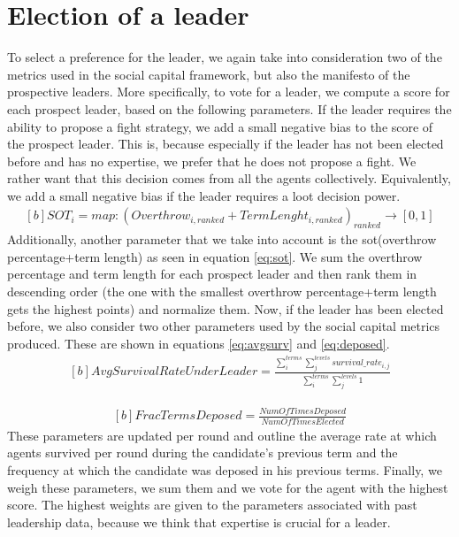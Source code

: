 \section{Election of a leader}To select a preference for the leader, we again take into consideration two of the metrics used in the social capital framework, but also the manifesto of the prospective leaders. More specifically, to vote for a leader, we compute a score for each prospect leader, based on the following parameters. If the leader requires the ability to propose a fight strategy, we add a small negative bias to the score of the prospect leader. This is, because especially if the leader has not been elected before and has no expertise, we prefer that he does not propose a fight. We rather want that this decision comes from all the agents collectively. Equivalently, we add a small negative bias if the leader requires a loot decision power. 
\begin{equation}
\label{eq:sot}
\begin{aligned}[b]
SOT_i = map : (Overthrow_{i,ranked} + TermLenght_{i, ranked})_{ranked} \rightarrow [0,1]
\end{aligned}
\end{equation}
Additionally, another parameter that we take into account is the sot(overthrow percentage+term length) as seen in equation \ref{eq:sot}. We sum the overthrow percentage and term length for each prospect leader and then rank them in descending order (the one with the smallest overthrow percentage+term length gets the highest points) and normalize them. Now, if the leader has been elected before, we also consider two other parameters used by the social capital metrics produced. These are shown in equations \ref{eq:avgsurv} and \ref{eq:deposed}.
\begin{equation}
\label{eq:avgsurv}
\begin{aligned}[b]
AvgSurvivalRateUnderLeader = \frac{\sum_{i} ^{terms} \sum_{j}^{levels} survival\_rate_{i,j}}{\sum_{i}^{terms} \sum_{j}^{levels} 1}
\end{aligned}
\end{equation}

\begin{equation}
\label{eq:deposed}
\begin{aligned}[b]
FracTermsDeposed = \frac{NumO\!f\!TimesDeposed}{NumO\!f\!TimesElected}
\end{aligned}
\end{equation}
These parameters are updated per round and outline the average rate at which agents survived per round during the candidate's previous term and the frequency at which the candidate was deposed in his previous terms.
Finally, we weigh these parameters, we sum them and we vote for the agent with the highest score. The highest weights are given to the parameters associated with past leadership data, because we think that expertise is crucial for a leader.\\

